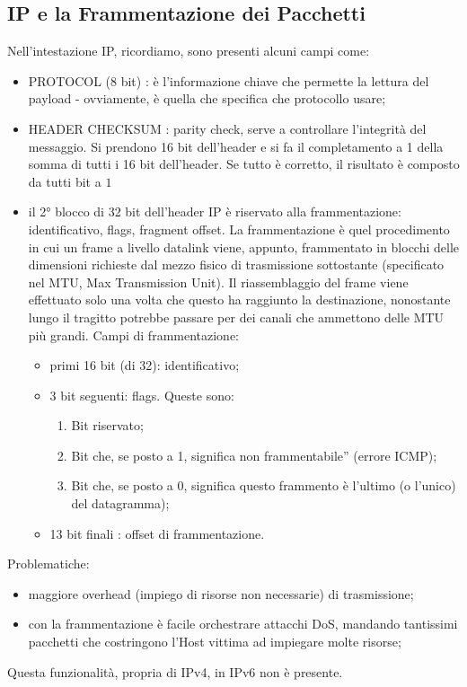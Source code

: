 \subsection*{IP e la Frammentazione dei Pacchetti}
\noindent Nell'intestazione IP, ricordiamo, sono presenti alcuni campi come:
\begin{itemize}
    \item PROTOCOL (8 bit) : è l'informazione chiave che permette la lettura del payload - ovviamente, è quella che specifica che protocollo usare;
    \item HEADER CHECKSUM : parity check, serve a controllare l'integrità del messaggio. Si prendono 16 bit dell'header e si fa il completamento a 1 della somma di tutti i 16 bit dell'header. Se tutto è corretto, il risultato è composto da tutti bit a $1$
    \item il 2° blocco di 32 bit dell'header IP è riservato alla frammentazione: identificativo, flags, fragment offset. La frammentazione è quel procedimento in cui un frame a livello datalink viene, appunto, frammentato in blocchi delle dimensioni richieste dal mezzo fisico di trasmissione sottostante (specificato nel MTU, Max Transmission Unit). Il riassemblaggio del frame viene effettuato solo una volta che questo ha raggiunto la destinazione, nonostante lungo il tragitto potrebbe passare per dei canali che ammettono delle MTU più grandi.
    Campi di frammentazione:
    \begin{itemize}
        \item primi 16 bit (di 32): identificativo;
        \item 3 bit seguenti: flags. Queste sono:
        \begin{enumerate}
            \item Bit riservato;
            \item Bit che, se posto a 1, significa \openapex non frammentabile'' (errore ICMP);
            \item Bit che, se posto a 0, significa \openapex questo frammento è l'ultimo (o l'unico) del datagramma);
        \end{enumerate}
        \item 13 bit finali : offset di frammentazione.
    \end{itemize}
\end{itemize}

\noindent Problematiche:
\begin{itemize}
    \item maggiore overhead (impiego di risorse non necessarie) di trasmissione;
    \item con la frammentazione è facile orchestrare attacchi DoS, mandando tantissimi pacchetti che costringono l'Host vittima ad impiegare molte risorse;
\end{itemize}
\noindent Questa funzionalità, propria di IPv4, in IPv6 non è presente.\\

